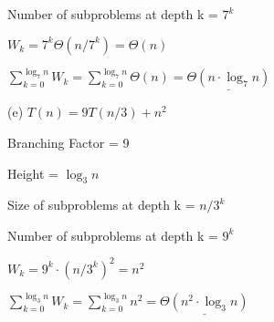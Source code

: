\documentclass{article} %
\begin{document}
    \hspace{13pt} Number of subproblems at depth k = $7^k$

    \hspace{13pt} $W_k = 7^k \Theta(n/7^k) = \Theta(n)$

    \hspace{13pt} $\sum^{\log_7 n}_{k = 0} W_k = \sum^{\log_7 n}_{k = 0} \Theta(n) = \underline{\Theta(n \cdot \log_7n)}$

    \vspace{5pt}

    (e) $T(n) = 9T(n / 3) + n^2$

    \hspace{13pt} Branching Factor = 9
    
    \hspace{13pt} Height = $\log_3n $

    \hspace{13pt} Size of subproblems at depth k = $n / 3^k$
    
    \hspace{13pt} Number of subproblems at depth k = $9^k$

    \hspace{13pt} $W_k = 9^k \cdot (n/3^k)^2 = n^2$

    \hspace{13pt} $\sum^{\log_3 n}_{k = 0} W_k = \sum^{\log_3 n}_{k = 0} n^2 = \underline{\Theta(n^2 \cdot \log_3n)}$
\end{document}
